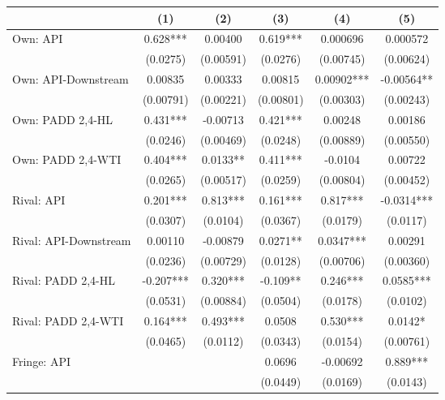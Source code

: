 {
\def\sym#1{\ifmmode^{#1}\else\(^{#1}\)\fi}
\begin{tabular}{l*{5}{c}}
\toprule
                &\multicolumn{1}{c}{(1)}   &\multicolumn{1}{c}{(2)}   &\multicolumn{1}{c}{(3)}   &\multicolumn{1}{c}{(4)}   &\multicolumn{1}{c}{(5)}   \\
\midrule
Own: API        &    0.628***&  0.00400   &    0.619***& 0.000696   & 0.000572   \\
                & (0.0275)   &(0.00591)   & (0.0276)   &(0.00745)   &(0.00624)   \\
\addlinespace
Own: API-Downstream&  0.00835   &  0.00333   &  0.00815   &  0.00902***& -0.00564** \\
                &(0.00791)   &(0.00221)   &(0.00801)   &(0.00303)   &(0.00243)   \\
\addlinespace
Own: PADD 2,4-HL&    0.431***& -0.00713   &    0.421***&  0.00248   &  0.00186   \\
                & (0.0246)   &(0.00469)   & (0.0248)   &(0.00889)   &(0.00550)   \\
\addlinespace
Own: PADD 2,4-WTI&    0.404***&   0.0133** &    0.411***&  -0.0104   &  0.00722   \\
                & (0.0265)   &(0.00517)   & (0.0259)   &(0.00804)   &(0.00452)   \\
\addlinespace
Rival: API      &    0.201***&    0.813***&    0.161***&    0.817***&  -0.0314***\\
                & (0.0307)   & (0.0104)   & (0.0367)   & (0.0179)   & (0.0117)   \\
\addlinespace
Rival: API-Downstream&  0.00110   & -0.00879   &   0.0271** &   0.0347***&  0.00291   \\
                & (0.0236)   &(0.00729)   & (0.0128)   &(0.00706)   &(0.00360)   \\
\addlinespace
Rival: PADD 2,4-HL&   -0.207***&    0.320***&   -0.109** &    0.246***&   0.0585***\\
                & (0.0531)   &(0.00884)   & (0.0504)   & (0.0178)   & (0.0102)   \\
\addlinespace
Rival: PADD 2,4-WTI&    0.164***&    0.493***&   0.0508   &    0.530***&   0.0142*  \\
                & (0.0465)   & (0.0112)   & (0.0343)   & (0.0154)   &(0.00761)   \\
\addlinespace
Fringe: API     &            &            &   0.0696   & -0.00692   &    0.889***\\
                &            &            & (0.0449)   & (0.0169)   & (0.0143)   \\

\end{tabular}}
